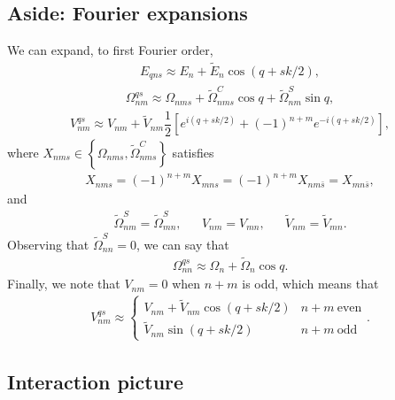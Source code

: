 \documentclass[aps,notitlepage,nofootinbib,10pt]{revtex4-1}
\renewcommand{\t}{\text} %
\newcommand{\f}[2]{\dfrac{#1}{#2}} %
\newcommand{\p}[1]{\left(#1\right)} %
\renewcommand{\sp}[1]{\left[#1\right]} %
\renewcommand{\set}[1]{\left\{#1\right\}} %
\newcommand{\1}{\mathds{1}}
\begin{document}
\subsection{Aside: Fourier expansions}

We can expand, to first Fourier order,
\begin{align}
  E_{qns} \approx E_n + \tilde E_n \cos\p{q + sk/2},
\end{align}
\begin{align}
  \Omega^{qs}_{nm}
  \approx \Omega_{nms} + \tilde\Omega_{nms}^C\cos q
  + \tilde\Omega_{nm}^S\sin q,
\end{align}
\begin{align}
  V^{qs}_{nm} \approx V_{nm} + \tilde V_{nm}
  \f12\sp{e^{i\p{q+sk/2}}+\p{-1}^{n+m}e^{-i\p{q+sk/2}}},
\end{align}
where $X_{nms}\in\set{\Omega_{nms},\tilde\Omega_{nms}^C}$ satisfies
\begin{align}
  X_{nms} = \p{-1}^{n+m} X_{mns} = \p{-1}^{n+m} X_{nm\bar s} = X_{mn\bar s},
\end{align}
and
\begin{align}
  \tilde\Omega_{nm}^S = \tilde\Omega_{mn}^S,
  && V_{nm} = V_{mn}, && \tilde V_{nm} = \tilde V_{mn}.
\end{align}
Observing that $\tilde\Omega_{nn}^S=0$, we can say that
\begin{align}
  \Omega^{qs}_{nn} \approx \Omega_n + \tilde\Omega_n\cos q.
\end{align}
Finally, we note that $V_{nm}=0$ when $n+m$ is odd, which means that
\begin{align}
  V^{qs}_{nm} \approx \left\{
    \begin{array}{ll}
      V_{nm} + \tilde V_{nm}\cos\p{q+sk/2} & n+m~\t{even} \\
      \tilde V_{nm}\sin\p{q+sk/2} & n+m~\t{odd}
    \end{array}\right..
\end{align}


\subsection{Interaction picture}
\end{document}
